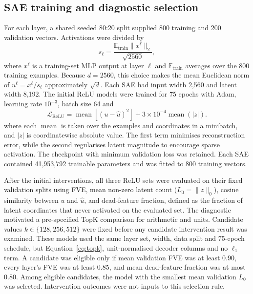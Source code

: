 \documentclass[11pt,a4paper]{article}
\begin{document}
\subsection{SAE training and diagnostic selection}
\label{sec:sae-training}

    For each layer, a shared seeded 80:20 split supplied 800 training and 200 validation vectors. Activations were divided by
\begin{equation}
    s_{\ell}=\frac{\mathbb{E}_{\mathrm{train}}\lVert x^{\ell}\rVert_2}
    {\sqrt{2560}},
\end{equation}
    where $x^\ell$ is a training-set MLP output at layer $\ell$ and $\mathbb{E}_{\mathrm{train}}$ averages over the 800 training examples. Because $d=2560$, this choice makes the mean Euclidean norm of $u^\ell=x^\ell/s_\ell$ approximately $\sqrt d$. Each SAE had input width 2,560 and latent width 8,192. The initial ReLU models were trained for 75 epochs with Adam, learning rate $10^{-3}$, batch size 64 and
\begin{equation}
    \mathcal{L}_{\mathrm{ReLU}}=\operatorname{mean}
    \left[(u-\hat{u})^2\right]+3\times10^{-4}\operatorname{mean}(|z|).
    \label{eq:relu-loss}
\end{equation}
    where each $\operatorname{mean}$ is taken over the examples and coordinates in a minibatch, and $|z|$ is coordinatewise absolute value. The first term minimises reconstruction error, while the second regularises latent magnitude to encourage sparse activation. The checkpoint with minimum validation loss was retained. Each SAE contained 41,953,792 trainable parameters and was fitted to 800 training vectors.

    After the initial interventions, all three ReLU sets were evaluated on their fixed validation splits using FVE, mean non-zero latent count ($L_0=\lVert z\rVert_0$), cosine similarity between $u$ and $\hat u$, and dead-feature fraction, defined as the fraction of latent coordinates that never activated on the evaluated set. The diagnostic motivated a pre-specified TopK comparison for arithmetic and units. Candidate values $k\in\{128,256,512\}$ were fixed before any candidate intervention result was examined. These models used the same layer set, width, data split and 75-epoch schedule, but Equation~\ref{eq:topk}, unit-normalised decoder columns and no $\ell_1$ term. A candidate was eligible only if mean validation FVE was at least 0.90, every layer's FVE was at least 0.85, and mean dead-feature fraction was at most 0.80. Among eligible candidates, the model with the smallest mean validation $L_0$ was selected. Intervention outcomes were not inputs to this selection rule.
\end{document}

